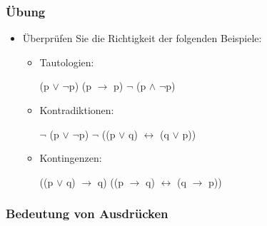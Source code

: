 \begin{frame}
\frametitle{Übung}

\begin{itemize}
	\item Überprüfen Sie die Richtigkeit der folgenden Beispiele:
	
	\vspace{1em}
	
	\begin{itemize}
		\item Tautologien:
	
		\eal
			\ex (p $\lor$ $\lnot$p)
			\ex (p $\rightarrow$ p)
			\ex $\lnot$ (p $\land$ $\lnot$p)
		\zl
			
		\item Kontradiktionen:
		
		\eal
			\ex $\lnot$ (p $\lor$ $\lnot$p)
			\ex $\lnot$ ((p $\lor$ q) $\leftrightarrow$ (q $\lor$ p))
		\zl

		\item Kontingenzen:
		
		\eal
			\ex ((p $\lor$ q) $\rightarrow$ q)
			\ex ((p $\rightarrow$ q) $\leftrightarrow$ (q $\rightarrow$ p))
		\zl
			
	\end{itemize}	
	
\end{itemize}

\end{frame}


\author{Stefan Müller}

\subsubsection{Bedeutung von Ausdrücken}

